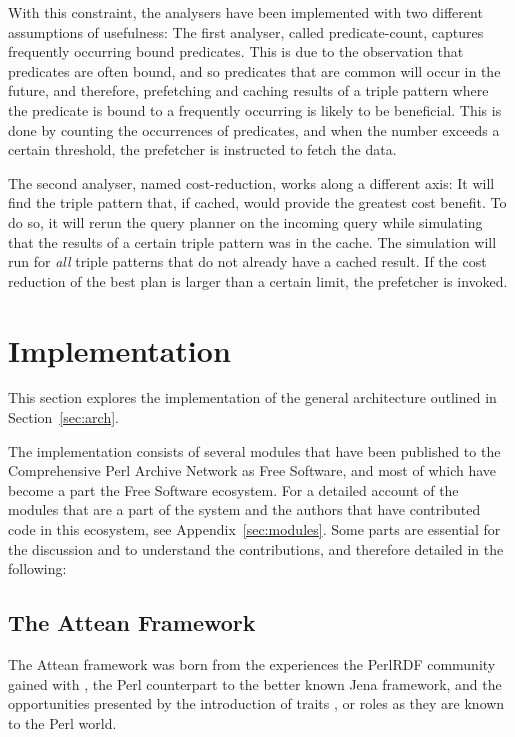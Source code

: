 With this constraint, the analysers have been implemented with two
different assumptions of usefulness: The first analyser, called
predicate-count, captures frequently occurring bound predicates. This is due to the
observation that predicates are often bound, and so predicates that
are common will occur in the future, and therefore, prefetching and
caching results of a triple pattern where the predicate is bound to a
frequently occurring is likely to be beneficial. This is done by
counting the occurrences of predicates, and when the number exceeds a
certain threshold, the prefetcher is instructed to fetch the data.

The second analyser, named cost-reduction, works along a different
axis: It will find the 
triple pattern that, if cached, would provide the greatest cost
benefit. To do so, it will rerun the query planner on the incoming
query while simulating that the results of a certain triple pattern
was in the cache. The simulation will run for \emph{all} triple
patterns that do not already have a cached result. If the cost
reduction of the best plan is larger than a certain limit, the
prefetcher is invoked.



\section{Implementation}\label{sec:impl}

This section explores the implementation of the general architecture
outlined in Section~\ref{sec:arch}. 

The implementation consists of several modules that have been
published to the Comprehensive Perl Archive Network as Free Software,
and most of which have become a part the Free Software ecosystem. For
a detailed account of the modules that are a part of the system and
the authors that have contributed code in this ecosystem, see
Appendix~\ref{sec:modules}. Some parts are essential for the
discussion and to understand the contributions, and therefore detailed
in the following:

\subsection{The Attean Framework}\label{sec:attean}

The Attean framework was born from the experiences the PerlRDF
community gained with , the Perl counterpart to
the better known Jena framework, and the opportunities presented by
the introduction of traits \cite{traits}, or roles as they are known
to the Perl world.


